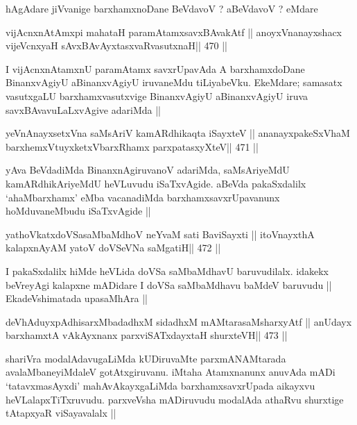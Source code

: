 \begin{artha}
hAgAdare jiVvanige barxhamxnoDane BeVdavoV ? aBeVdavoV ? eMdare
\end{artha}

\begin{shl}
vijAcnxnAtAmx\s pi mahataH paramAtamxsavxBAvakAtf ||
anoyxV\s nanayxshacx vijeVcnxyaH sAvxBAvAyxtasxvaRvasutxnaH\hfill || 470 ||
\end{shl}

\begin{artha}
I vijAcnxnAtamxnU paramAtamx savxrUpavAda A barxhamxdoDane
BinanxvAgiyU aBinanxvAgiyU iruvaneMdu tiLiyabeVku. EkeMdare;
samasatx vasutxgaLU barxhamxvasutxvige BinanxvAgiyU aBinanxvAgiyU iruva
savxBAvavuLaLxvAgive adariMda ||
\end{artha}




\begin{shl}
yeVnAnayxsetxVna saMsAriV kamARdhikaqta iSayxteV ||
ananayxpakeSxV\s haM barxhemxVtuyxketxVbarxRhamx parxpatasxyXteV\hfill || 471 ||
\end{shl}

\begin{artha}
yAva BeVdadiMda BinanxnAgiruvanoV adariMda, saMsAriyeMdU
kamARdhikAriyeMdU heVLuvudu iSaTxvAgide. aBeVda pakaSxdalilx
`ahaMbarxhamx' eMba vacanadiMda barxhamxsavxrUpavanunx hoMduvaneMbudu
iSaTxvAgide ||
\end{artha}

\begin{shl}
yathoVkatxdoVSasaMbaMdhoV neYvaM sati BaviSayxti ||
itoV\s nayxthA kalapxnAyAM yatoV doVSeVNa saMgatiH\hfill || 472 ||
\end{shl}

\begin{artha}
I pakaSxdalilx hiMde heVLida doVSa saMbaMdhavU baruvudilalx. idakekx
beVreyAgi kalapxne mADidare I doVSa saMbaMdhavu baMdeV baruvudu ||
EkadeVshimatada upasaMhAra ||
\end{artha}



\begin{shl}
deVhAduyxpAdhisarxMbadadhxM sidadhxM mAMtarasaMsharxyAtf ||
anUdayx barxhamxtA vAkAyxnanx parxviSATxdayxtaH shurxteVH\hfill || 473 ||
\end{shl}

\begin{artha}
shariVra modalAdavugaLiMda kUDiruvaMte parxmANAMtarada 
avalaMbaneyiMdaleV
gotAtxgiruvanu. iMtaha Atamxnanunx anuvAda mADi `tatavxmasAyxdi'
mahAvAkayxgaLiMda barxhamxsavxrUpada aikayxvu heVLalapxTiTxruvudu.
parxveVsha mADiruvudu modalAda athaRvu shurxtige tAtapxyaR
viSayavalalx ||
\end{artha}


